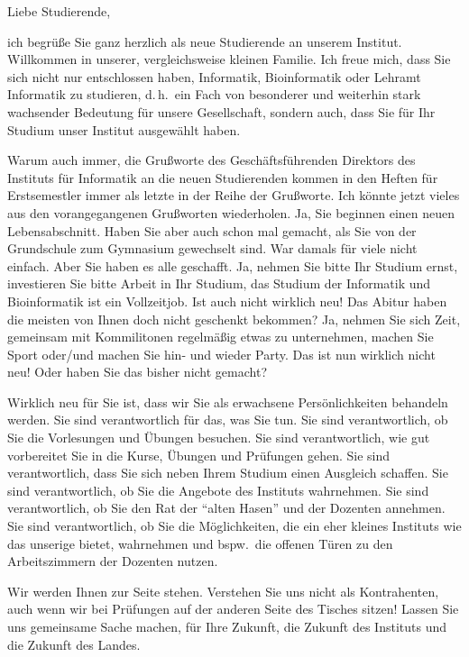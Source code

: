 Liebe Studierende,

ich begrüße Sie ganz herzlich als neue Studierende an unserem Institut.
Willkommen in unserer, vergleichsweise kleinen Familie. Ich freue mich, dass Sie
sich nicht nur entschlossen haben, Informatik, Bioinformatik oder Lehramt
Informatik zu studieren, d.\,h.\ ein Fach von  besonderer und weiterhin stark
wachsender Bedeutung für unsere Gesellschaft, sondern auch, dass Sie für Ihr
Studium unser Institut ausgewählt haben.

Warum auch immer, die Grußworte des Geschäftsführenden Direktors des Instituts
für Informatik an die neuen Studierenden kommen in den Heften für Erstsemestler
immer als letzte in der Reihe der Grußworte. Ich könnte jetzt vieles aus den
vorangegangenen Grußworten wiederholen. Ja, Sie beginnen einen neuen
Lebensabschnitt. Haben Sie aber auch schon mal  gemacht, als Sie von der
Grundschule zum Gymnasium gewechselt sind. War damals für viele nicht einfach.
Aber Sie haben es alle geschafft. Ja, nehmen Sie bitte Ihr Studium ernst,
investieren Sie bitte Arbeit in Ihr Studium, das Studium der Informatik und
Bioinformatik ist ein Vollzeitjob. Ist auch nicht wirklich neu! Das Abitur haben
die meisten von Ihnen doch nicht geschenkt bekommen? Ja, nehmen Sie sich Zeit,
gemeinsam mit Kommilitonen regelmäßig etwas zu unternehmen, machen Sie Sport
oder/und machen Sie hin- und wieder Party. Das ist nun wirklich nicht neu! Oder
haben Sie das bisher nicht gemacht?

Wirklich neu für Sie ist, dass wir Sie als erwachsene Persönlichkeiten behandeln
werden. Sie sind verantwortlich für das, was Sie tun. Sie sind verantwortlich,
ob Sie die Vorlesungen und Übungen besuchen. Sie sind verantwortlich, wie gut
vorbereitet Sie in die Kurse, Übungen und Prüfungen gehen. Sie sind
verantwortlich, dass Sie sich neben Ihrem Studium einen Ausgleich schaffen. Sie
sind verantwortlich, ob Sie die Angebote des Instituts wahrnehmen. Sie sind
verantwortlich, ob Sie den Rat der \enquote{alten Hasen} und der Dozenten annehmen. Sie
sind verantwortlich, ob Sie die Möglichkeiten, die ein eher kleines Instituts
wie das unserige bietet, wahrnehmen und bspw.\ die offenen Türen zu den
Arbeitszimmern der Dozenten nutzen.

Wir werden Ihnen zur Seite stehen. Verstehen Sie uns nicht als Kontrahenten,
auch wenn wir bei Prüfungen auf der anderen Seite des Tisches sitzen! Lassen Sie
uns gemeinsame Sache machen, für Ihre Zukunft, die Zukunft des Instituts und die
Zukunft des Landes.

